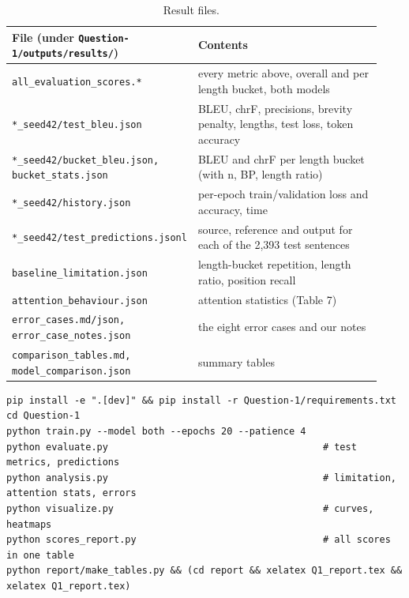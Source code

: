 \documentclass[10pt,a4paper]{article}
\newcommand{\code}[1]{\texttt{#1}}
\begin{document}
\begin{table}[H]\centering\small
\begin{tabular}{@{}p{0.43\linewidth}p{0.5\linewidth}@{}}\toprule
File (under \code{Question-1/outputs/results/}) & Contents\\\midrule
\code{all\_evaluation\_scores.*} & every metric above, overall and per length bucket, both models\\
\code{*\_seed42/test\_bleu.json} & BLEU, chrF, precisions, brevity penalty, lengths, test loss, token accuracy\\
\code{*\_seed42/bucket\_bleu.json, bucket\_stats.json} & BLEU and chrF per length bucket (with n, BP, length ratio)\\
\code{*\_seed42/history.json} & per-epoch train/validation loss and accuracy, time\\
\code{*\_seed42/test\_predictions.jsonl} & source, reference and output for each of the 2,393 test sentences\\
\code{baseline\_limitation.json} & length-bucket repetition, length ratio, position recall\\
\code{attention\_behaviour.json} & attention statistics (Table 7)\\
\code{error\_cases.md/json, error\_case\_notes.json} & the eight error cases and our notes\\
\code{comparison\_tables.md, model\_comparison.json} & summary tables\\\bottomrule
\end{tabular}\caption{Result files.}\end{table}

\begin{verbatim}
pip install -e ".[dev]" && pip install -r Question-1/requirements.txt
cd Question-1
python train.py --model both --epochs 20 --patience 4
python evaluate.py                                      # test metrics, predictions
python analysis.py                                      # limitation, attention stats, errors
python visualize.py                                     # curves, heatmaps
python scores_report.py                                 # all scores in one table
python report/make_tables.py && (cd report && xelatex Q1_report.tex && xelatex Q1_report.tex)
\end{verbatim}

\appendix
\end{document}
